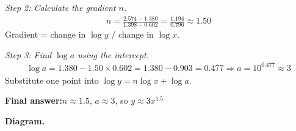 \documentclass[11pt]{article}
\begin{document}
\textit{Step 2: Calculate the gradient \( n \).}
\[\begin{gathered}
n = \frac{2.574 - 1.380}{1.398 - 0.602} = \frac{1.194}{0.796} \approx 1.50
\end{gathered}\]
Gradient = change in \( \log y \) / change in \( \log x \).

\textit{Step 3: Find \( \log a \) using the intercept.}
\[\begin{gathered}
\log a = 1.380 - 1.50 \times 0.602 = 1.380 - 0.903 = 0.477 \Rightarrow a = 10^{0.477} \approx 3
\end{gathered}\]
Substitute one point into \( \log y = n\log x + \log a \).

\begin{answerbox}
\textbf{Final answer:}\quad \(\displaystyle  n \approx 1.5 \), \(\displaystyle  a \approx 3 \), so \(\displaystyle  y \approx 3x^{1.5} \)
\end{answerbox}
\textbf{Diagram.}
\end{document}
